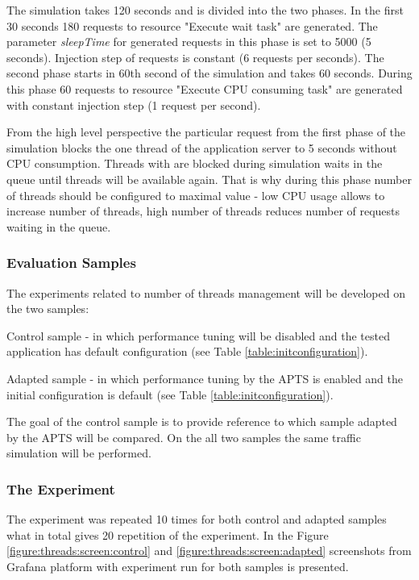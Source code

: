 \documentclass[12pt,a4paper]{article}
\let\tempone\itemize
\let\temptwo\enditemize
\renewenvironment{itemize}{\tempone\addtolength{\itemsep}{-0.4\baselineskip}}{\temptwo}
\begin{document}
The simulation takes 120 seconds and is divided into the two phases. In the first 30 seconds 180 requests to resource "Execute wait task" are generated. The parameter \textit{sleepTime} for generated requests in this phase is set to 5000 (5 seconds). Injection step of requests is constant (6 requests per seconds). The second phase starts in 60th second of the simulation and takes 60 seconds. During this phase 60 requests to resource "Execute CPU consuming task" are generated with constant injection step (1 request per second). 

From the high level perspective the particular request from the first phase of the simulation blocks the one thread of the application server to 5 seconds without CPU consumption. Threads with are blocked during simulation waits in the queue until threads will be available again. That is why during this phase number of threads should be configured to maximal value - low CPU usage allows to increase number of threads, high number of threads reduces number of requests waiting in the queue.   

 
\subsubsection{Evaluation Samples}

The experiments related to number of threads management will be developed on the two samples:
\begin{itemize}
\item Control sample - in which performance tuning will be disabled and the tested application has default  configuration (see Table \ref{table:initconfiguration}).  
\item Adapted sample - in which performance tuning by the APTS is enabled and the initial configuration is default (see Table \ref{table:initconfiguration}).
\end{itemize}

The goal of the control sample is to provide reference to which sample adapted by the APTS will be compared. On the all two samples the same traffic simulation will be performed.
 
\subsubsection{The Experiment} 

The experiment was repeated 10 times for both control and adapted samples what in total gives 20 repetition of the experiment. In the Figure \ref{figure:threads:screen:control} and \ref{figure:threads:screen:adapted} screenshots from Grafana platform with experiment run for both samples is presented.
\end{document}
